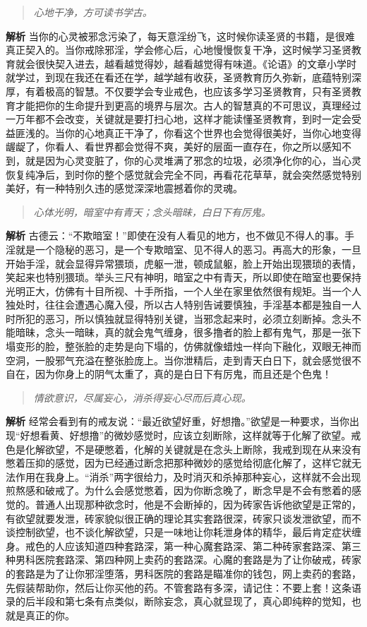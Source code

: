 \begin{quote}\it
    心地干净，方可读书学古。
\end{quote}

\textbf{解析} 当你的心灵被邪念污染了，每天意淫纷飞，这时候你读圣贤的书籍，是很难真正契入的。当你戒除邪淫，学会修心后，心地慢慢恢复干净，这时候学习圣贤教育就会很快契入进去，越看越觉得妙，越看越觉得有味道。《论语》的文章小学时就学过，到现在我还在看还在学，越学越有收获，圣贤教育历久弥新，底蕴特别深厚，有着极高的智慧。不仅要学会专业戒色，也应该多学习圣贤教育，只有圣贤教育才能把你的生命提升到更高的境界与层次。古人的智慧真的不可思议，真理经过一万年都不会改变，关键就是要打扫心地，这样才能读懂圣贤教育，到时一定会受益匪浅的。当你的心地真正干净了，你看这个世界也会觉得很美好，当你心地变得龌龊了，你看人、看世界都会觉得不爽，美好的层面一直存在，你之所以感知不到，就是因为心灵变脏了，你的心灵堆满了邪念的垃圾，必须净化你的心，当心灵恢复纯净后，到时你的整个感觉就会完全不同，再看花花草草，就会突然感觉特别美好，有一种特别久违的感觉深深地震撼着你的灵魂。

\begin{quote}\it
    心体光明，暗室中有青天；念头暗昧，白日下有厉鬼。
\end{quote}

\textbf{解析} 古德云：“不欺暗室！”即使在没有人看见的地方，也不做见不得人的事。手淫就是一个隐秘的恶习，是一个专欺暗室、见不得人的恶习。再高大的形象，一旦开始手淫，就会显得异常猥琐，虎躯一泄，顿成鼠躯，脸上开始出现猥琐的表情，笑起来也特别猥琐。举头三尺有神明，暗室之中有青天，所以即使在暗室也要保持光明正大，仿佛有十目所视、十手所指，一个人坐在家里依然很有规矩。当一个人独处时，往往会遭遇心魔入侵，所以古人特别告诫要慎独，手淫基本都是独自一人时所犯的恶习，所以慎独就显得特别关键，当邪念起来时，必须立刻断掉。念头不能暗昧，念头一暗昧，真的就会鬼气缠身，很多撸者的脸上都有鬼气，那是一张下塌变形的脸，整张脸的走势是向下塌的，仿佛就像蜡烛一样向下融化，双眼无神而空洞，一股邪气充溢在整张脸庞上。当你泄精后，走到青天白日下，就会感觉很不自在，因为你身上的阴气太重了，真的是白日下有厉鬼，而且还是个色鬼！

\begin{quote}\it
    情欲意识，尽属妄心，消杀得妄心尽而后真心现。
\end{quote}

\textbf{解析} 经常会看到有的戒友说：“最近欲望好重，好想撸。”欲望是一种要求，当你出现“好想看黄、好想撸”的微妙感觉时，应该立刻断除，这样就等于化解了欲望。戒色是化解欲望，不是硬憋着，化解的关键就是在念头上断除，我戒到现在从来没有憋着压抑的感觉，因为已经通过断念把那种微妙的感觉给彻底化解了，这样它就无法作用在我身上。“消杀”两字很给力，及时消灭和杀掉那种妄心，这样就不会出现煎熬感和破戒了。为什么会感觉憋着，因为你断念晚了，断念早是不会有憋着的感觉的。普通人出现那种欲念时，他是不会断掉的，因为砖家告诉他欲望是正常的，有欲望就要发泄，砖家貌似很正确的理论其实套路很深，砖家只谈发泄欲望，而不谈控制欲望，也不谈化解欲望，只是一味地让你耗泄身体的精华，最后肯定症状缠身。戒色的人应该知道四种套路深，第一种心魔套路深、第二种砖家套路深、第三种男科医院套路深、第四种网上卖药的套路深。心魔的套路是为了让你破戒，砖家的套路是为了让你邪淫堕落，男科医院的套路是瞄准你的钱包，网上卖药的套路，先假装帮助你，然后让你买他的药。不管套路有多深，请记住：不要上套！这条语录的后半段和第七条有点类似，断除妄念，真心就显现了，真心即纯粹的觉知，也就是真正的你。

